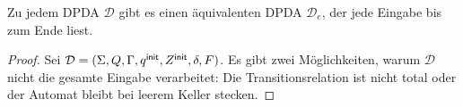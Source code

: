 {\begin{lemma}[name={[\acs*{DPDA}, der gesamte Eingabe verarbeitet]}]
        \label{lem:DPDA ges. Eingabe}
        Zu jedem \ac{DPDA} $\mathcal{D}$ gibt es einen äquivalenten \ac{DPDA} $\mathcal{D}_e$, der
        jede Eingabe bis zum Ende liest.
\end{lemma}
\begin{proof}

  Sei $\mathcal{D} = (\Sigma, Q, \Gamma, q^\mathsf{init}, Z^\mathsf{init}, \delta, F)$. 
  Es gibt zwei Möglichkeiten, warum $\mathcal{D}$ nicht die gesamte Eingabe verarbeitet:
  Die Transitionsrelation ist nicht total 
  oder der Automat bleibt bei
  leerem Keller stecken.


\end{proof}}
